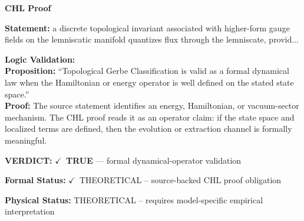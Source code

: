 \vspace{0.45em}
\noindent\textbf{CHL Proof}\par
\textbf{Statement:} a discrete topological invariant associated with higher-form gauge fields on the
lemniscatic manifold quantizes flux through the lemniscate, provid...

\textbf{Logic Validation:}\\
\textbf{Proposition:} ``Topological Gerbe Classification is valid as a formal dynamical law when the Hamiltonian
or energy operator is well defined on the stated state space.''\\
\textbf{Proof:} The source statement identifies an energy, Hamiltonian, or vacuum-sector mechanism. The
CHL proof reads it as an operator claim: if the state space and localized terms are
defined, then the evolution or extraction channel is formally meaningful.

\textbf{VERDICT:} \ensuremath{\checkmark}\ \textbf{TRUE} --- formal dynamical-operator validation

\textbf{Formal Status:} \ensuremath{\checkmark}\ THEORETICAL -- source-backed CHL proof obligation

\textbf{Physical Status:} THEORETICAL -- requires model-specific empirical interpretation
\par\vspace{0.45em}
\par
\ifTZPDarkEdition
{}
\fi
\endgroup
\endgroup
